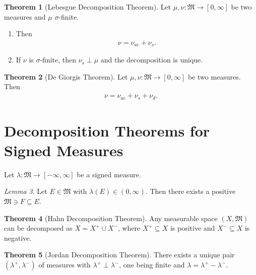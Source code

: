 \documentclass[10pt, leqno]{amsart}
\theoremstyle{definition}
\newtheorem{theorem}{Theorem}[section]
\theoremstyle{remark}
\newtheorem{lemma}[theorem]{Lemma}
\begin{document}
    \begin{theorem}[Lebesgue Decomposition Theorem] \label{thm:lebesgue_decomposition_theorem}
        Let \(\mu, \nu\colon \mathfrak{M} \to [0, \infty]\) be two measures and \(\mu\) \(\sigma\)-finite.
        \begin{enumerate}[label=(\roman*), wide]
            \item \label{thm:lebesgue_decomposition_theorem_1} Then
            \begin{align}
                \nu = \nu_{ac} + \nu_s.
            \end{align}
            \item \label{thm:lebesgue_decomposition_theorem_2} If \(\nu\) is \(\sigma\)-finite, then \(\nu_s \perp \mu\) and the decomposition is unique.
        \end{enumerate}
    \end{theorem}

    \begin{theorem}[De Giorgis Theorem]
        Let \(\mu, \nu\colon \mathfrak{M} \to [0, \infty]\) be two measures. Then
        \begin{align}
            \nu = \nu_{ac} + \nu_s + \nu_d.
        \end{align}
    \end{theorem}

    \section{Decomposition Theorems for Signed Measures} \phantom{}

    Let \(\lambda\colon \mathfrak{M} \to [-\infty, \infty]\) be a signed measure.

    \begin{lemma} \label{lem:existence_of_positive_subset}
        Let \(E \in \mathfrak{M}\) with \(\lambda(E) \in (0, \infty)\). Then there exists a positive \(\mathfrak{M} \ni F \subseteq E\).
    \end{lemma}

    \begin{theorem}[Hahn Decomposition Theorem] \label{thm:hahn_decomposition}
        Any measurable space \((X, \mathfrak{M})\) can be decomposed as \(X = X^+ \cup X^-\), where \(X^+ \subseteq X\) is positive and \(X^- \subseteq X\) is negative.
    \end{theorem}

    \begin{theorem}[Jordan Decomposition Theorem] \label{thm:jordan_decomposition}
        There exists a unique pair \((\lambda^+, \lambda^-)\) of measures with \(\lambda^+ \perp \lambda^-\), one being finite and \(\lambda = \lambda^+ - \lambda^-\).
    \end{theorem}
\end{document}
